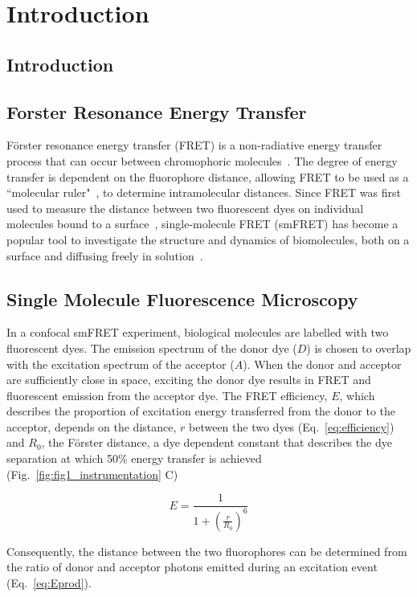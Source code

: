 \chapter{Introduction}
\label{chap:intro}
\section{Introduction}
\section{Forster Resonance Energy Transfer}
F\"{o}rster resonance energy transfer (FRET) is a non-radiative energy transfer process that can occur between chromophoric molecules~\cite{forster48}. The degree of energy transfer is dependent on the fluorophore distance, allowing FRET to be used as a ``molecular ruler"~\cite{stryer67}, to determine intramolecular distances. Since FRET was first used to measure the distance between two fluorescent dyes on individual molecules bound to a surface~\cite{ha96}, single-molecule FRET (smFRET) has become a popular tool to investigate the structure and dynamics of biomolecules, both on a surface and diffusing freely in solution~\cite{haran03, schuler02, weiss00}.

\section{Single Molecule Fluorescence Microscopy}
In a confocal smFRET experiment, biological molecules are labelled with two fluorescent dyes. The emission spectrum of the donor dye ($D$) is chosen to overlap with the excitation spectrum of the acceptor ($A$). When the donor and acceptor are sufficiently close in space, exciting the donor dye results in FRET and fluorescent emission from the acceptor dye. The FRET efficiency, $E$, which describes the proportion of excitation energy transferred from the donor to the acceptor, depends on the distance, $r$ between the two dyes (Eq.~\ref{eq:efficiency}) and $R_0$, the F\"{o}rster distance, a dye dependent constant that describes the dye separation at which 50\% energy transfer is achieved (Fig.~\ref{fig:fig1_instrumentation} C)

\begin{equation}
E = \frac{1}{1 + (\frac{r}{R_0})^6} 
\label{eq:efficiency}
\end{equation}

Consequently, the distance between the two fluorophores can be determined from the ratio of donor and acceptor photons emitted during an excitation event (Eq.~\ref{eq:Eprod}).

